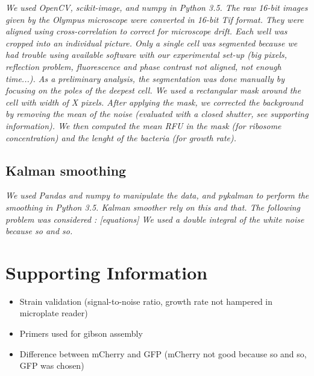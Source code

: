 \textit{We used OpenCV, scikit-image, and numpy in Python 3.5.
The raw 16-bit images given by the Olympus microscope were converted in 16-bit Tif format.
They were aligned using cross-correlation to correct for microscope drift.
Each well was cropped into an individual picture.
Only a single cell was segmented because we had trouble using available software with our experimental set-up (big pixels, reflection problem, fluorescence and phase contrast not aligned, not enough time...).
As a preliminary analysis, the segmentation was done manually by focusing on the poles of the deepest cell.
We used a rectangular mask around the cell with width of X pixels.
After applying the mask, we corrected the background by removing the mean of the noise (evaluated with a closed shutter, see supporting information).
We then computed the mean RFU in the mask (for ribosome concentration) and the lenght of the bacteria (for growth rate).
}

\subsection{Kalman smoothing}

\textit{We used Pandas and numpy to manipulate the data, and pykalman to perform the smoothing in Python 3.5.
Kalman smoother rely on this and that.
The following problem was considered :
[equations]
We used a double integral of the white noise because so and so.
}


\section{Supporting Information}

\begin{itemize}
\item Strain validation (signal-to-noise ratio, growth rate not hampered in microplate reader)
\item Primers used for gibson assembly
\item Difference between mCherry and GFP (mCherry not good because so and so, GFP was chosen)
\end{itemize}